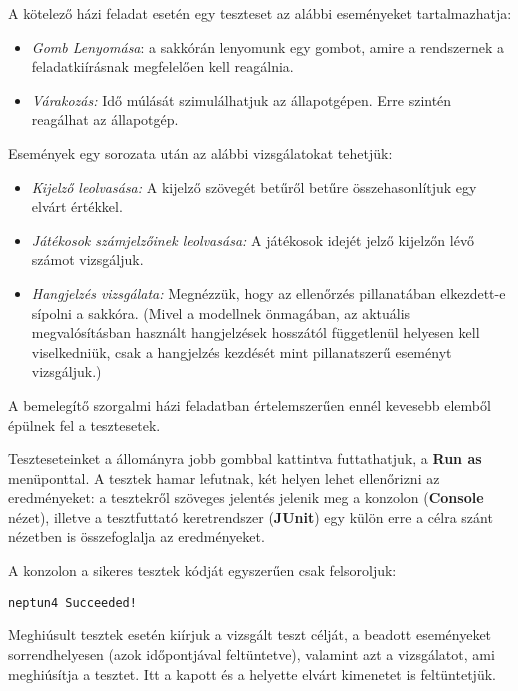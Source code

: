 A kötelező házi feladat esetén egy teszteset az alábbi eseményeket tartalmazhatja:

\begin{itemize}
	\item \emph{Gomb Lenyomása}: a sakkórán lenyomunk egy gombot, amire a rendszernek a feladatkiírásnak megfelelően kell reagálnia.
	\item \emph{Várakozás:} Idő múlását szimulálhatjuk az állapotgépen. Erre szintén reagálhat az állapotgép.
\end{itemize}

Események egy sorozata után az alábbi vizsgálatokat tehetjük:

\begin{itemize}
	\item \emph{Kijelző leolvasása:} A kijelző szövegét betűről betűre összehasonlítjuk egy elvárt értékkel.
	\item \emph{Játékosok számjelzőinek leolvasása:} A játékosok idejét jelző kijelzőn lévő számot vizsgáljuk.
	\item \emph{Hangjelzés vizsgálata:} Megnézzük, hogy az ellenőrzés pillanatában elkezdett-e sípolni a sakkóra. (Mivel a modellnek önmagában, az aktuális megvalósításban használt hangjelzések hosszától függetlenül helyesen kell viselkedniük, csak a hangjelzés kezdését mint pillanatszerű eseményt vizsgáljuk.)
\end{itemize}

A bemelegítő szorgalmi házi feladatban értelemszerűen ennél kevesebb elemből épülnek fel a tesztesetek.

Teszteseteinket a  állományra jobb gombbal kattintva futtathatjuk, a \textbf{Run as} menüponttal. A tesztek hamar lefutnak, két helyen lehet ellenőrizni az eredményeket: a tesztekről szöveges jelentés jelenik meg a konzolon (\textbf{Console} nézet), illetve a tesztfuttató keretrendszer (\textbf{JUnit}) egy külön erre a célra szánt nézetben is összefoglalja az eredményeket.

A konzolon a sikeres tesztek kódját egyszerűen csak felsoroljuk:

\begin{lstlisting}
neptun4 Succeeded!
\end{lstlisting}

Meghiúsult tesztek esetén kiírjuk a vizsgált teszt célját, a beadott eseményeket sorrendhelyesen (azok időpontjával feltüntetve), valamint azt a vizsgálatot, ami meghiúsítja a tesztet. Itt a kapott és a helyette elvárt kimenetet is feltüntetjük.

